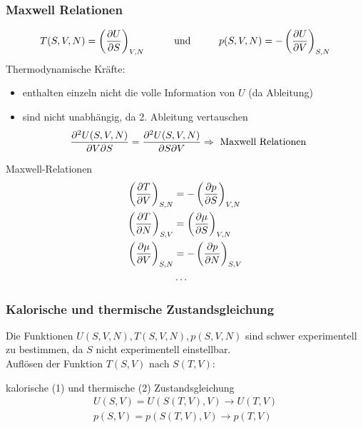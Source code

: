 \subsubsection{Maxwell Relationen}
\begin{align}
    T(S,V,N)=\left(\frac{\partial U}{\partial S}\right)_{V,N} \hspace{1cm} \text{und} \hspace{1cm} p(S,V,N)= -\left(\frac{\partial U}{\partial V}\right)_{S,N}
\end{align}
Thermodynamische Kräfte:
\begin{itemize}
    \item enthalten einzeln nicht die volle Information von $U$ (da Ableitung)
    \item sind nicht unabhängig, da 2. Ableitung vertauschen
        \begin{align}
            \pdv{U(S,V,N)}{V}{S}=\pdv{U(S,V,N)}{S}{V} &\Rightarrow \text{ Maxwell Relationen} 
        \end{align}
\end{itemize}



\begin{definition}{Maxwell-Relationen}
    \begin{align}
        \left(\frac{\partial T}{\partial V}\right)_{S,N} &= -\left(\frac{\partial p}{\partial S}\right)_{V,N}\\
        \left(\frac{\partial T}{\partial N}\right)_{S,V} &=\left(\frac{\partial \mu}{\partial S}\right)_{V,N}\\
        \left(\frac{\partial \mu}{\partial V}\right)_{S,N} &=-\left(\frac{\partial p}{\partial N}\right)_{S,V}\\
        &\dots
    \end{align}
\end{definition}


\subsubsection{Kalorische und thermische Zustandsgleichung}
Die Funktionen $U(S,V,N),T(S,V,N),p(S,V,N)$ sind schwer experimentell zu bestimmen, da $S$ nicht experimentell einstellbar.\\
Auflösen der Funktion $T(S,V)$ nach $S(T,V)$:
\begin{definition}{kalorische (1) und thermische (2) Zustandsgleichung}
    \begin{align}
        U(S,V) = U(S(T,V),V) \rightarrow U(T,V)\\
        p(S,V) = p(S(T,V),V) \rightarrow p(T,V)
    \end{align}
\end{definition}

